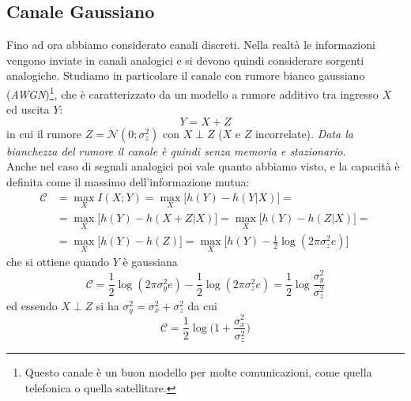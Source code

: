 \subsection{Canale Gaussiano}
Fino ad ora abbiamo considerato canali discreti. Nella realtà le informazioni vengono inviate in canali analogici e si devono quindi considerare sorgenti analogiche. Studiamo in particolare il canale con rumore bianco gaussiano (\textit{AWGN})\footnote{Questo canale \`e un buon modello per molte comunicazioni, come quella telefonica o quella satellitare.}, che è caratterizzato da un modello a rumore additivo tra ingresso $X$ ed uscita $Y$:
\begin{equation}
    Y = X + Z
\end{equation}
in cui il rumore $Z = \mathcal{N}(0; \sigma_z^2)$ con $X \perp Z$ ($X$ e $Z$ incorrelate). \textit{Data la bianchezza del rumore il canale \`e quindi senza memoria e stazionario}. \\
Anche nel caso di segnali analogici poi vale quanto abbiamo visto, e la capacità è definita come il massimo
dell’informazione mutua:
\begin{align*}
    \mathcal{C} &= \max_{X} I(X;Y) = \max_{X} \big [ h(Y) - h(Y|X) \big ]= \\
    &=\max_{X} \big [ h(Y) - h(X+Z|X) \big ]= \max_{X} \big [ h(Y) - h(Z|X) \big ]= \\
    &=\max_{X} \big [ h(Y) - h(Z) \big ] = \max_{X} \big [ h(Y) - \frac{1}{2}\log (2 \pi \sigma_z^2 e )\big ]
\end{align*}
che si ottiene quando $Y$ \`e gaussiana
\begin{equation*}
    \mathcal{C} = \frac{1}{2}\log (2 \pi \sigma_y^2 e) - \frac{1}{2}\log (2 \pi \sigma_z^2 e) = \frac{1}{2} \log \frac{\sigma_y^2}{\sigma_z^2}
\end{equation*}
ed essendo $X \perp Z$ si ha $\sigma_y^2 = \sigma_x^2 + \sigma_z^2$ da cui
\begin{equation}
    \mathcal{C} = \frac{1}{2} \log \bigg ( 1 + \frac{\sigma_x^2}{\sigma_z^2} \bigg )
\end{equation}

